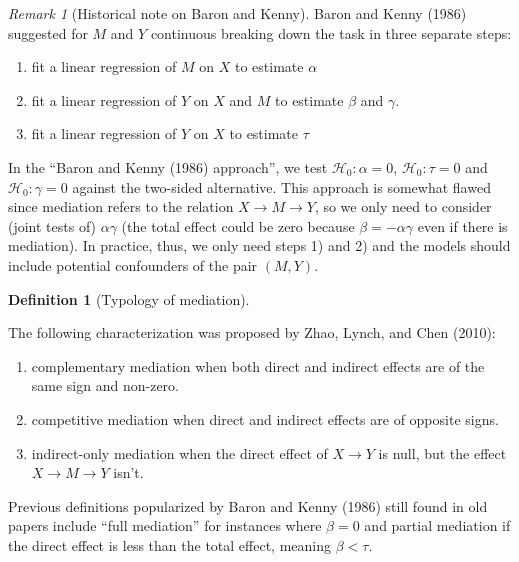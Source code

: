 \documentclass[
  11pt,
  letterpaper,
]{scrbook}
\providecommand{\tightlist}{%
  \setlength{\itemsep}{0pt}\setlength{\parskip}{0pt}}\usepackage{longtable,booktabs,array}
\theoremstyle{definition}
\newtheorem{definition}{Definition}[chapter]
\theoremstyle{definition}
\theoremstyle{remark}
\newtheorem{refremark}{Remark}[chapter]
\begin{document}
\begin{refremark}[Historical note on Baron and Kenny]
Baron and Kenny (1986) suggested for \(M\) and \(Y\) continuous breaking
down the task in three separate steps:

\begin{enumerate}
\def\labelenumi{\arabic{enumi})}
\tightlist
\item
  fit a linear regression of \(M\) on \(X\) to estimate \(\alpha\)
\item
  fit a linear regression of \(Y\) on \(X\) and \(M\) to estimate
  \(\beta\) and \(\gamma\).
\item
  fit a linear regression of \(Y\) on \(X\) to estimate \(\tau\)
\end{enumerate}

In the ``Baron and Kenny (1986) approach'', we test
\(\mathscr{H}_0: \alpha=0\), \(\mathscr{H}_0: \tau=0\) and
\(\mathscr{H}_0: \gamma=0\) against the two-sided alternative. This
approach is somewhat flawed since mediation refers to the relation
\(X \to M \to Y\), so we only need to consider (joint tests of)
\(\alpha\gamma\) (the total effect could be zero because
\(\beta = -\alpha\gamma\) even if there is mediation). In practice,
thus, we only need steps 1) and 2) and the models should include
potential confounders of the pair \((M, Y)\).

\label{rem-histnote}

\end{refremark}

\begin{definition}[Typology of
mediation]\protect\hypertarget{def-typology}{}\label{def-typology}

The following characterization was proposed by Zhao, Lynch, and Chen
(2010):

\begin{enumerate}
\def\labelenumi{\arabic{enumi}.}
\tightlist
\item
  complementary mediation when both direct and indirect effects are of
  the same sign and non-zero.
\item
  competitive mediation when direct and indirect effects are of opposite
  signs.
\item
  indirect-only mediation when the direct effect of \(X \to Y\) is null,
  but the effect \(X \to M \to Y\) isn't.
\end{enumerate}

Previous definitions popularized by Baron and Kenny (1986) still found
in old papers include ``full mediation'' for instances where \(\beta=0\)
and partial mediation if the direct effect is less than the total
effect, meaning \(\beta < \tau\).

\end{definition}
\end{document}
